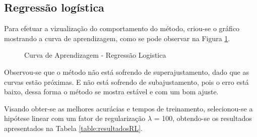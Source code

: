\subsection{Regressão logística}

Para efetuar a vizualização do comportamento do método, criou-se o gráfico mostrando a curva de aprendizagem, como se pode observar na Figura \ref{fig:RL}.

\begin{figure}[h]
\centering
{}
\caption{Curva de Aprendizagem - Regressão Logistica}
\label{fig:RL}
\end{figure}

Observou-se que o método não está sofrendo de superajustamento, dado que as curvas estão próximas. E não está sofrendo de subajustamento, pois o erro está baixo, dessa forma o método se mostra estável e com um bom ajuste.

Visando obter-se as melhores acurácias e tempos de treinamento, selecionou-se a hipótese linear com um fator de regularização \(\lambda\) = 100, obtendo-se os resultados apresentados na Tabela \ref{table:resultadosRL}.

